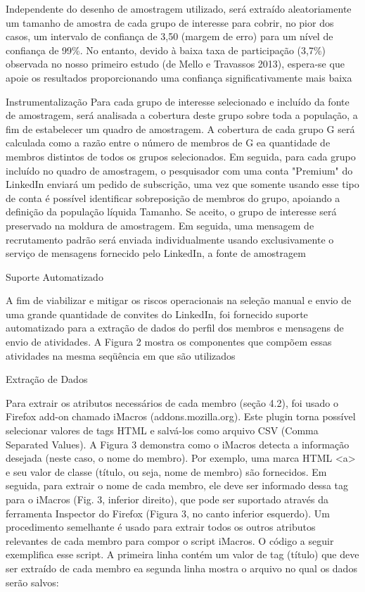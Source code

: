 Independente do desenho de amostragem utilizado, será extraído aleatoriamente um
tamanho de amostra de cada grupo de interesse para cobrir, no pior dos casos, um
intervalo de confiança de 3,50 (margem de erro) para um nível de confiança de
99\%. No entanto, devido à baixa taxa de participação (3,7\%) observada no nosso
primeiro estudo (de Mello e Travassos 2013), espera-se que apoie os resultados
proporcionando uma confiança significativamente mais baixa

Instrumentalização
Para cada grupo de interesse selecionado e incluído da fonte de amostragem, será
analisada a cobertura deste grupo sobre toda a população, a fim de estabelecer
um quadro de amostragem. A cobertura de cada grupo G será calculada como a razão
entre o número de membros de G ea quantidade de membros distintos de todos os
grupos selecionados. Em seguida, para cada grupo incluído no quadro de
amostragem, o pesquisador com uma conta "Premium" do LinkedIn enviará um pedido
de subscrição, uma vez que somente usando esse tipo de conta é possível
identificar sobreposição de membros do grupo, apoiando a definição da população
líquida Tamanho. Se aceito, o grupo de interesse será preservado na moldura de
amostragem. Em seguida, uma mensagem de recrutamento padrão será enviada
individualmente usando exclusivamente o serviço de mensagens fornecido pelo
LinkedIn, a fonte de amostragem

Suporte Automatizado

A fim de viabilizar e mitigar os riscos operacionais na seleção manual e envio
de uma grande quantidade de convites do LinkedIn, foi fornecido suporte
automatizado para a extração de dados do perfil dos membros e mensagens de envio
de atividades. A Figura 2 mostra os componentes que compõem essas atividades na
mesma seqüência em que são utilizados

Extração de Dados

Para extrair os atributos necessários de cada membro (seção 4.2), foi usado o
Firefox add-on chamado iMacros (addons.mozilla.org). Este plugin torna possível
selecionar valores de tags HTML e salvá-los como arquivo CSV (Comma Separated
Values). A Figura 3 demonstra como o iMacros detecta a informação desejada
(neste caso, o nome do membro).
Por exemplo, uma marca HTML <a> e seu valor de classe (título, ou seja, nome de
membro) são fornecidos. Em seguida, para extrair o nome de cada membro, ele deve
ser informado dessa tag para o iMacros (Fig. 3, inferior direito), que pode ser
suportado através da ferramenta Inspector do Firefox (Figura 3, no canto
inferior esquerdo). Um procedimento semelhante é usado para extrair todos os
outros atributos relevantes de cada membro para compor o script iMacros. O
código a seguir exemplifica esse script. A primeira linha contém um valor de tag
(título) que deve ser extraído de cada membro ea segunda linha mostra o arquivo
no qual os dados serão salvos:

